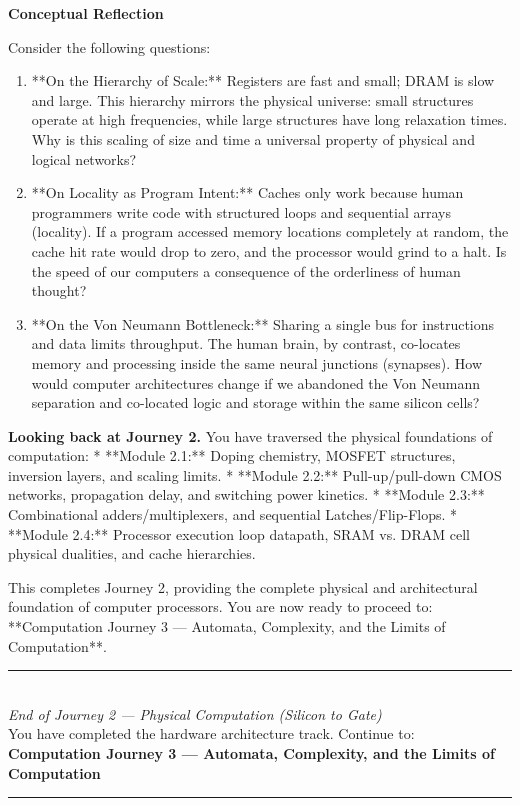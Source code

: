 \documentclass[12pt, a4paper]{book}
\begin{document}
\begin{reflectionbox}
\textbf{Conceptual Reflection}

Consider the following questions:
\begin{enumerate}
  \item **On the Hierarchy of Scale:** Registers are fast and small; DRAM is slow and large. This hierarchy mirrors the physical universe: small structures operate at high frequencies, while large structures have long relaxation times. Why is this scaling of size and time a universal property of physical and logical networks?
  \item **On Locality as Program Intent:** Caches only work because human programmers write code with structured loops and sequential arrays (locality). If a program accessed memory locations completely at random, the cache hit rate would drop to zero, and the processor would grind to a halt. Is the speed of our computers a consequence of the orderliness of human thought?
  \item **On the Von Neumann Bottleneck:** Sharing a single bus for instructions and data limits throughput. The human brain, by contrast, co-locates memory and processing inside the same neural junctions (synapses). How would computer architectures change if we abandoned the Von Neumann separation and co-located logic and storage within the same silicon cells?
\end{enumerate}
\end{reflectionbox}

\medskip
\noindent\textbf{Looking back at Journey 2.}
You have traversed the physical foundations of computation:
* **Module 2.1:** Doping chemistry, MOSFET structures, inversion layers, and scaling limits.
* **Module 2.2:** Pull-up/pull-down CMOS networks, propagation delay, and switching power kinetics.
* **Module 2.3:** Combinational adders/multiplexers, and sequential Latches/Flip-Flops.
* **Module 2.4:** Processor execution loop datapath, SRAM vs. DRAM cell physical dualities, and cache hierarchies.

This completes Journey 2, providing the complete physical and architectural foundation of computer processors. You are now ready to proceed to: **Computation Journey 3 --- Automata, Complexity, and the Limits of Computation**.

\vspace{1.4cm}
\begin{center}
{\color{JourneyColor}\rule{0.5\linewidth}{0.8pt}}\\[6pt]
{\small\color{JourneyColor}\textit{End of Journey 2 --- Physical Computation (Silicon to Gate)}}\\[4pt]
{\small\color{JourneyColor}You have completed the hardware architecture track. Continue to: \textbf{Computation Journey 3 --- Automata, Complexity, and the Limits of Computation}}\\[6pt]
{\color{JourneyColor}\rule{0.5\linewidth}{0.8pt}}
\end{center}
\end{document}
